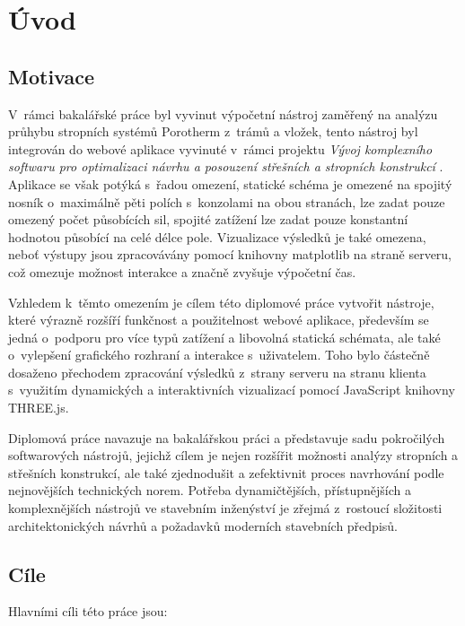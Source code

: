 \chapter*{Úvod}

\section*{Motivace}

V~rámci bakalářské práce \cite{mythesis} byl vyvinut výpočetní nástroj zaměřený na analýzu průhybu stropních systémů Porotherm z~trámů a vložek,
tento nástroj byl integrován do webové aplikace vyvinuté v~rámci projektu \textit{Vývoj komplexního softwaru pro optimalizaci návrhu a posouzení střešních a stropních konstrukcí} \cite{wbapp}. Aplikace se však potýká s~řadou omezení, statické schéma je omezené na spojitý nosník o~maximálně pěti polích s~konzolami na obou stranách, lze zadat pouze omezený počet působících sil, spojité zatížení lze zadat pouze konstantní hodnotou působící na celé délce pole. Vizualizace výsledků je také omezena, neboť výstupy jsou zpracovávány pomocí knihovny matplotlib \cite{matplotlib} na straně serveru, což omezuje možnost interakce a značně zvyšuje výpočetní čas.

Vzhledem k~těmto omezením je cílem této diplomové práce vytvořit nástroje, které výrazně rozšíří funkčnost a použitelnost webové aplikace, především se jedná o~podporu pro více typů zatížení a libovolná statická schémata, ale také o~vylepšení grafického rozhraní a interakce s~uživatelem. Toho bylo částečně dosaženo přechodem zpracování výsledků z~strany serveru na stranu klienta s~využitím dynamických a interaktivních vizualizací pomocí JavaScript knihovny THREE.js.

Diplomová práce navazuje na bakalářskou práci a představuje sadu pokročilých softwarových nástrojů, jejichž cílem je nejen rozšířit možnosti analýzy stropních a střešních konstrukcí, ale také zjednodušit a zefektivnit proces navrhování podle nejnovějších technických norem. Potřeba dynamičtějších, přístupnějších a komplexnějších nástrojů ve stavebním inženýství je zřejmá z~rostoucí složitosti architektonických návrhů a požadavků moderních stavebních předpisů.


\section*{Cíle}

Hlavními cíli této práce jsou:

